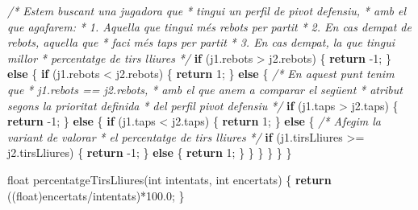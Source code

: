 \documentclass[
]{book}
\newenvironment{Shaded}{\begin{snugshade}}{\end{snugshade}}
\newcommand{\CommentTok}[1]{\textcolor[rgb]{0.56,0.35,0.01}{\textit{#1}}}
\newcommand{\ControlFlowTok}[1]{\textcolor[rgb]{0.13,0.29,0.53}{\textbf{#1}}}
\newcommand{\DataTypeTok}[1]{\textcolor[rgb]{0.13,0.29,0.53}{#1}}
\newcommand{\DecValTok}[1]{\textcolor[rgb]{0.00,0.00,0.81}{#1}}
\newcommand{\FloatTok}[1]{\textcolor[rgb]{0.00,0.00,0.81}{#1}}
\newcommand{\NormalTok}[1]{#1}
\begin{document}
\begin{Shaded}
\begin{Highlighting}[]
    \CommentTok{/* Estem buscant una jugadora que }
\CommentTok{     * tingui un perfil de pivot defensiu, }
\CommentTok{     * amb el que agafarem:}
\CommentTok{     * 1. Aquella que tingui més rebots per partit}
\CommentTok{     * 2. En cas d\textquotesingle{}empat de rebots, aquella que}
\CommentTok{     *    faci més taps per partit}
\CommentTok{     * 3. En cas d\textquotesingle{}empat, la que tingui millor}
\CommentTok{     *    percentatge de tirs lliures}
\CommentTok{     */} 
    \ControlFlowTok{if}\NormalTok{ (j1.rebots \textgreater{} j2.rebots) \{}
        \ControlFlowTok{return}\NormalTok{ {-}}\DecValTok{1}\NormalTok{;}
\NormalTok{    \} }\ControlFlowTok{else}\NormalTok{ \{}
        \ControlFlowTok{if}\NormalTok{ (j1.rebots \textless{} j2.rebots) \{}
            \ControlFlowTok{return} \DecValTok{1}\NormalTok{;}
\NormalTok{        \} }\ControlFlowTok{else}\NormalTok{ \{}
            \CommentTok{/* En aquest punt tenim que }
\CommentTok{             * j1.rebots == j2.rebots,}
\CommentTok{             * amb el que anem a comparar el següent}
\CommentTok{             * atribut segons la prioritat definida}
\CommentTok{             * del perfil pivot defensiu}
\CommentTok{             */}
            \ControlFlowTok{if}\NormalTok{ (j1.taps \textgreater{} j2.taps) \{}
                \ControlFlowTok{return}\NormalTok{ {-}}\DecValTok{1}\NormalTok{;}
\NormalTok{            \} }\ControlFlowTok{else}\NormalTok{ \{}
                \ControlFlowTok{if}\NormalTok{ (j1.taps \textless{} j2.taps) \{}
                    \ControlFlowTok{return} \DecValTok{1}\NormalTok{;}
\NormalTok{                \} }\ControlFlowTok{else}\NormalTok{ \{}
                    \CommentTok{/* Afegim la variant de valorar}
\CommentTok{                     * el percentatge de tirs lliures}
\CommentTok{                     */}
                    \ControlFlowTok{if}\NormalTok{ (j1.tirsLliures \textgreater{}= j2.tirsLliures) \{}
                        \ControlFlowTok{return}\NormalTok{ {-}}\DecValTok{1}\NormalTok{;}
\NormalTok{                    \} }\ControlFlowTok{else}\NormalTok{ \{}
                        \ControlFlowTok{return} \DecValTok{1}\NormalTok{;}
\NormalTok{                    \}}
\NormalTok{                \}}
\NormalTok{            \}}
\NormalTok{        \}}
\NormalTok{    \}}
\NormalTok{\}}

\DataTypeTok{float}\NormalTok{ percentatgeTirsLliures(}\DataTypeTok{int}\NormalTok{ intentats, }\DataTypeTok{int}\NormalTok{ encertats) \{}
    \ControlFlowTok{return}\NormalTok{ ((}\DataTypeTok{float}\NormalTok{)encertats/intentats)*}\FloatTok{100.0}\NormalTok{;}
\NormalTok{\}}
\end{Highlighting}
\end{Shaded}
\end{document}
